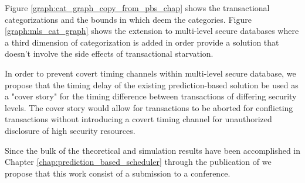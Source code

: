 Figure \ref{graph:cat_graph_copy_from_pbs_chap} shows the transactional categorizations and the bounds in which deem the categories. Figure \ref{graph:mls_cat_graph} shows the extension to multi-level secure databases where a third dimension of categorization is added in order provide a solution that doesn't involve the side effects of transactional starvation.


In order to prevent covert timing channels within multi-level secure database, we propose that the timing delay of the existing prediction-based solution be used as a "cover story" for the timing difference between transactions of differing security levels. The cover story would allow for transactions to be aborted for conflicting transactions without introducing a covert timing channel for unauthorized disclosure of high security resources.

Since the bulk of the theoretical and simulation results have been accomplished in Chapter \ref{chap:prediction_based_scheduler} through the publication of \cite{ravan_ensuring_2020} we propose that this work consist of a submission to a conference.